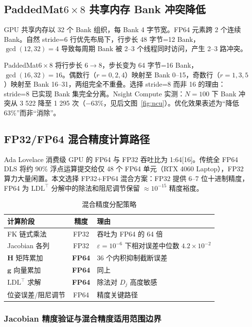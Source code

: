 \documentclass[twocolumn,a4paper,10pt]{ctexart}
\begin{document}
\subsection{PaddedMat$6\times8$ 共享内存 Bank 冲突降低}

GPU 共享内存以 32 个 Bank 组织，每 Bank 4 字节宽。FP64 元素跨 2 个连续 Bank。自然 stride=6 行优先布局下，行步长 48 字节=12 Bank，$\gcd(12,32)=4$ 导致每周期 Bank 被 2--3 个线程同时访问，产生 2--3 路冲突。

PaddedMat$6\times8$ 将行步长 $6\to8$，步长变为 64 字节=16 Bank，$\gcd(16,32)=16$。偶数行（$r=0,2,4$）映射至 Bank 0--15，奇数行（$r=1,3,5$）映射至 Bank 16--31，两组完全不重叠。选择 stride=8 而非 16 的理由：stride=8 已实现 Bank 集完全分离。Nsight Compute 实测：$N=100$ 下 Bank 冲突从 3 522 降至 1 295 次（$-63\%$，见后文图~\ref{fig:ncu}）。优化效果表述为``降低 63\%''而非``消除''。

\subsection{FP32/FP64 混合精度计算路径}

Ada Lovelace 消费级 GPU 的 FP64 与 FP32 吞吐比为 1:64[16]。传统全 FP64 DLS 将约 90\% 浮点运算提交给仅 48 个 FP64 单元（RTX 4060 Laptop），FP32 算力大量闲置。本文选择 FP32+FP64 混合方案：FP32 提供 6--7 位十进制精度，FP64 为 $\mathrm{LDL}^\top$ 分解中的除法和阻尼调节保留 $\approx10^{-15}$ 精度裕度。

\begin{table}[ht]
\centering\small
\caption{混合精度分配策略}
\label{tab:mixedprec}
\begin{tabular}{lcl}
\toprule
计算阶段 & 精度 & 理由 \\
\midrule
FK 链式乘法 & FP32 & 吞吐为 FP64 的 64 倍 \\
Jacobian 各列 & FP32 & $\varepsilon=10^{-6}$ 下相对误差中位数 $4.2\times10^{-2}$ \\
$\mathbf{H}$ 矩阵累加 & {\bfseries FP64} & 36 个内积抑制截断误差 \\
$\mathbf{g}$ 向量累加 & {\bfseries FP64} & 同上 \\
$\mathrm{LDL}^\top$ 求解 & {\bfseries FP64} & 除法对 $D_j$ 高度敏感 \\
位姿误差/阻尼调节 & FP64 & 精度关键路径 \\
\bottomrule
\end{tabular}
\end{table}

\subsubsection{Jacobian 精度验证与混合精度适用范围边界}
\end{document}
